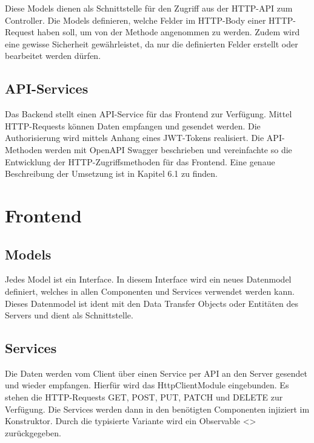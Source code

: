 Diese Models dienen als Schnittstelle für den Zugriff aus der HTTP-API zum Controller. Die Models definieren, welche Felder im HTTP-Body
einer HTTP-Request haben soll, um von der Methode angenommen zu werden. Zudem wird eine gewisse Sicherheit gewährleistet, da nur die definierten Felder 
erstellt oder bearbeitet werden dürfen.

\subsection{API-Services}
Das Backend stellt einen API-Service für das Frontend zur Verfügung. Mittel HTTP-Requests können Daten empfangen und gesendet werden. 
Die Authorisierung wird mittels Anhang eines JWT-Tokens realisiert. Die API-Methoden werden mit OpenAPI Swagger beschrieben und vereinfachte so die Entwicklung 
der HTTP-Zugriffsmethoden für das Frontend. Eine genaue Beschreibung der Umsetzung ist in Kapitel 6.1 zu finden.

\newpage
\section{Frontend}

\subsection{Models}
Jedes Model ist ein Interface. In diesem Interface wird ein neues Datenmodel definiert,
welches in allen Componenten und Services verwendet werden kann. Dieses Datenmodel
ist ident mit den Data Transfer Objects oder Entitäten des Servers und dient als
Schnittstelle.
\subsection{Services}
Die Daten werden vom Client über einen Service per API an den Server gesendet
und wieder empfangen. Hierfür wird das HttpClientModule eingebunden. Es stehen
die HTTP-Requests GET, POST, PUT, PATCH und DELETE zur Verfügung. Die
Services werden dann in den benötigten Componenten injiziert im Konstruktor. Durch
die typisierte Variante wird ein Observable <> zurückgegeben.